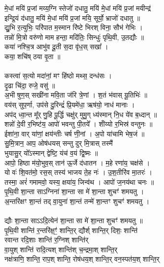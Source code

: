 मे॒धां मयि॑ प्र॒जां मय्य॒ग्नि स्तेजो॑ दधातु॒ मयि॑ मे॒धां मयि॑ प्र॒जां मयीन्द्र॑ \\
इन्द्रि॒यं द॑धातु॒ मयि॑ मे॒धां मयि॑ प्र॒जां मयि॒ सूर्यो॒ भ्राजो॑ दधातु ॥\\
द्यु॒भि र॒त्युभिः॒ परि॑पात म॒स्मान रि॑ष्टे भिरश् विना॒ सौभ॑ गेभिः । \\
तन्नो॑ मि॒त्रो वरु॑णो माम हन्ता॒ मदि॑तिः॒ सिन्धुः॑ पृथि॒वी, उ॒तद्यौः ॥\\
कया॑ नश्चि॒त्र आभु॑व दू॒ती स॒दा वृ॑ध॒स् सखा᳚ । \\
कया॒ शचि॑ष् ठया वृ॒ता ॥\\
\\
कस्त्वा॑ स॒त्यो मदा॑नां॒ मꣳ हि॑ष्ठो मथ्स॒ दन्ध॑सः । \\
दृ॒ढा चि॑दा॒ रुजे॒ वसु॑ ॥\\
अ॒भी षुण॒स् सखी॑ना मवि॒ता ज॑रि त्रे॒णां । श॒तं भ॑वास् यू॒तिभिः॑ ॥\\
वय॑स् सुप॒र्णा, उप॑से दु॒रिन्द्रं॑ प्रि॒यमे॑धा॒ ऋष॑यो॒ नाध॑ मानाः । \\
अप॑द् ध्वा॒न्त मू᳚र् णु॒हि पू॒र्द्धि चक्षु॑र् मुमु॒ग् ध्य॑स्मान् नि॒ध ये॑व ब॒ध्दान् ॥\\
शन्नो॑ दे॒वी र॒भिष्ट॑य॒ आपो॑ भवन्तु पी॒तये᳚ । शांँय्यो र॒भिस्र॑ वन्तुनः ॥\\
ईशा॑ना॒ वार् या॑णां॒ क्षय॑न्तीः चर्ष णी॒नां । अ॒पो या॑चामि भेष॒जं ॥\\
सु॒मि॒त्रान॒ आप॒ ओष॑धयस् सन्तु दुर् मि॒त्रास् तस्मै॑ \\
भुयासु॒र् यो᳚ऽस्मान् द्वेष्टि॒ यंच॑ व॒यं द्वि॒ष्मः ॥\\
आपो॒ हिष्ठा म॑यो॒भुव॒स् तान॑ ऊ॒र्जे द॑धातन । म॒हे रणा॑य॒ चक्ष॑से । \\
यो वः॑ शि॒वत॑मो॒ रस॒स् तस्य॑ भाजय ते॒ह नः॑ । उ॒श॒तीरि॑व मा॒तरः॑ ।\\
तस्मा॒ अरं॑ गमामवो॒ यस्य॒ क्षया॑य॒ जिन्व॑थ । आपो॑ ज॒नय॑था चनः ॥\\
पृ॒थि॒वी शा॒न्ता साऽग्निना॑ शा॒न्ता सा मे॑ शा॒न्ता शुचꣳ॑ शमयतु । \\
अ॒न्तरि॑क्षꣳ शा॒न्तं तद् वा॒युना॑ शा॒न्तं तन्मे॑ शा॒न्तꣳ शुचꣳ॑ शमयतु । \\
\\
द्यौः शा॒न्ता साऽऽदि॒त्येन॑ शा॒न्ता सा मे॑ शा॒न्ता शुचꣳ॑ शमयतु ॥\\
पृ॒थि॒वी शान्ति॑ र॒न्तरि॑क्ष॒ꣳ॒॑ शान्ति॒र् द्यौर्श् शान्ति॒र् दिशः॒ शान्ति॑ \\
रवान्त रदि॒शाः शान्ति॑ र॒ग्निश् शान्ति॑र्\\
वा॒युश् शान्ति॑ रादि॒त्यश् शान्ति॑श् च॒न्द्रमा॒श् शान्ति॒र्\\
नक्ष॑त्राणि॒ शान्ति॒ राप॒श् शान्ति॒ रोष॑धय॒श् शान्ति॒र् वन॒स्पत॑य॒श् शान्ति॒र्\\
